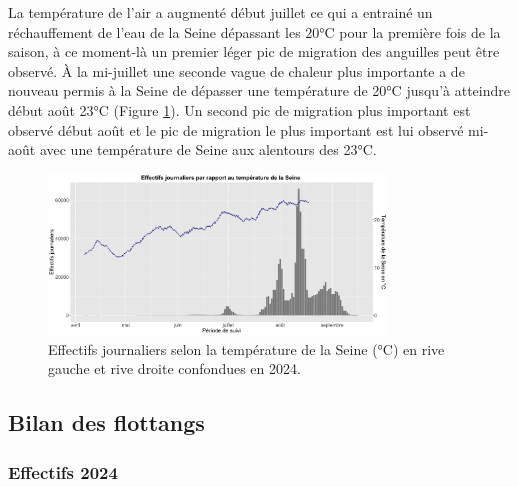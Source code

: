 \documentclass[11pt,titlepage,twoside]{article}\usepackage[]{graphicx}\usepackage[table]{xcolor}
\begin{document}
La température de l’air a augmenté début juillet ce qui a entrainé un réchauffement de l’eau de la Seine dépassant les 20°C pour la première fois de la saison, à ce moment-là un premier léger pic de migration des anguilles peut être observé. À la mi-juillet une seconde vague de chaleur plus importante a de nouveau permis à la Seine de dépasser une température de 20°C jusqu’à atteindre début août 23°C (Figure \ref{graph_temp_eau_oral}). Un second pic de migration plus important est observé début août et le pic de migration le plus important est lui observé mi-août avec une température de Seine aux alentours des 23°C.


\begin{figure}[htpb]
\centering
\includegraphics[width=0.8\textwidth]{graph_temp_eau_oral.png}
\caption{Effectifs journaliers selon la température de la Seine (°C) en rive gauche et rive droite confondues en 2024.}
\label{graph_temp_eau_oral}
\end{figure} 

\subsection{Bilan des flottangs }

\subsubsection{Effectifs 2024}
\end{document}
